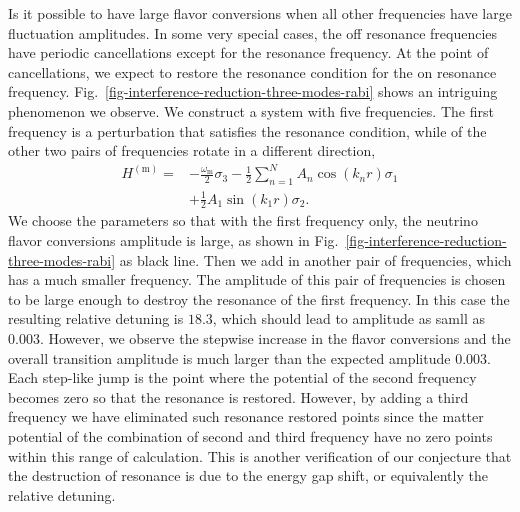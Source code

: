 \documentclass[%
reprint,
 amsmath,amssymb,
 prd,
]{revtex4-1}
\begin{document}
Is it possible to have large flavor conversions when all other frequencies have large fluctuation amplitudes. In some very special cases, the off resonance frequencies have periodic cancellations except for the resonance frequency. At the point of cancellations, we expect to restore the resonance condition for the on resonance frequency. Fig.~\ref{fig-interference-reduction-three-modes-rabi} shows an intriguing phenomenon we observe. We construct a system with five frequencies. The first frequency is a perturbation that satisfies the resonance condition, while of the other two pairs of frequencies rotate in a different direction,
\begin{align}
    H^{(\mathrm{m})}  =& -\frac{\omega_{\mathrm{m}}}{2} \sigma_3 - \frac{1}{2} \sum_{n=1}^N  A_n \cos (k_n r) \sigma_1 \nonumber\\
    &+ \frac{1}{2}A_1\sin(k_1 r) \sigma_2.
\label{eq-hamiltonian-rabi-two-modes-interference-3}
\end{align}
We choose the parameters so that with the first frequency only, the neutrino flavor conversions amplitude is large, as shown in Fig.~\ref{fig-interference-reduction-three-modes-rabi} as black line. Then we add in another pair of frequencies, which has a much smaller frequency. The amplitude of this pair of frequencies is chosen to be large enough to destroy the resonance of the first frequency. In this case the resulting relative detuning is $18.3$, which should lead to amplitude as samll as $0.003$. However, we observe the stepwise increase in the flavor conversions and the overall transition amplitude is much larger than the expected amplitude $0.003$. Each step-like jump is the point where the potential of the second frequency becomes zero so that the resonance is restored. However, by adding a third frequency we have eliminated such resonance restored points since the matter potential of the combination of second and third frequency have no zero points within this range of calculation. This is another verification of our conjecture that the destruction of resonance is due to the energy gap shift, or equivalently the relative detuning.


\end{document}

